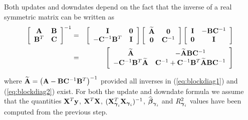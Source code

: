 \documentclass{article}[12pt]
\begin{document}
Both updates and downdates depend on the fact that
the inverse of a real symmetric matrix can be written as
\begin{eqnarray}
	\displaystyle \left[ \begin{array}{cc}
		{\bf A}   & {\bf B} \\
		{\bf B}^T & {\bf C}
	\end{array} \right]^{-1}
	&  = &
	\displaystyle \left[ \begin{array}{cc}
		{\bf I} & {\bf 0} \\
		-{\bf C}^{-1}{\bf B}^T &  {\bf I}
	\end{array} \right]
	\left[ \begin{array}{cc}
		\widetilde{{\bf A}} & {\bf 0} \\
		{\bf 0} & {\bf C}^{-1}
	\end{array} \right]
	\left[ \begin{array}{cc}
		{\bf I}    & -{\bf B}{\bf C}^{-1}\\
		{\bf 0} & {\bf I}
	\end{array} \right] \label{eq:blockdiag1}\\
	&  = &
	\displaystyle\left[
	\begin{array}{cc}
		\widetilde{{\bf A}}
		& - \widetilde{{\bf A}}{\bf B}{\bf C}^{-1} \\
		-{\bf C}^{-1}{\bf B}^T\widetilde{{\bf A}}
		& {\bf C}^{-1} + {\bf C}^{-1}{\bf B}^T\widetilde{{\bf A}}{\bf B}{\bf C}^{-1}
	\end{array}\right]\label{eq:blockdiag2}
\end{eqnarray}

\noindent where $\widetilde{{\bf A}} = \left({\bf A}-{\bf B}{\bf C}^{-1}{\bf B}^T\right)^{-1}$
provided all inverses in (\ref{eq:blockdiag1}) and
(\ref{eq:blockdiag2}) exist. 
For both the update and downdate formula we assume that the quantities
${\bf X}^T{\bf y}$, ${\bf X}^T{\bf X}$, $({\bf X}_{{\boldsymbol \gamma}_i}^T{\bf X}_{{\boldsymbol \gamma}_i})^{-1}$, 
$\widehat{{\boldsymbol \beta}}_{{\boldsymbol \gamma}_i}$ and $R_{{\boldsymbol \gamma}_i}^2$ values have been computed from the previous step.
\end{document}
